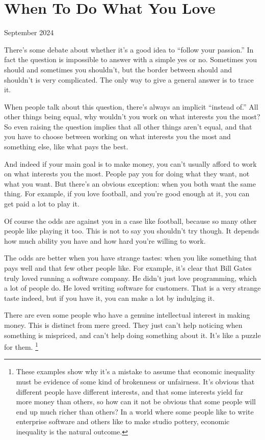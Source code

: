 \chapter{When To Do What You Love}

September 2024

There's some debate about whether it's a good idea to ``follow your
passion.'' In fact the question is impossible to answer with a simple
yes or no. Sometimes you should and sometimes you shouldn't, but the
border between should and shouldn't is very complicated. The only way to
give a general answer is to trace it.

When people talk about this question, there's always an implicit
``instead of.'' All other things being equal, why wouldn't you work on
what interests you the most? So even raising the question implies that
all other things aren't equal, and that you have to choose between
working on what interests you the most and something else, like what
pays the best.

And indeed if your main goal is to make money, you can't usually afford
to work on what interests you the most. People pay you for doing what
they want, not what you want. But there's an obvious exception: when you
both want the same thing. For example, if you love football, and you're
good enough at it, you can get paid a lot to play it.

Of course the odds are against you in a case like football, because so
many other people like playing it too. This is not to say you shouldn't
try though. It depends how much ability you have and how hard you're
willing to work.

The odds are better when you have strange tastes: when you like
something that pays well and that few other people like. For example,
it's clear that Bill Gates truly loved running a software company. He
didn't just love programming, which a lot of people do. He loved writing
software for customers. That is a very strange taste indeed, but if you
have it, you can make a lot by indulging it.

There are even some people who have a genuine intellectual interest in
making money. This is distinct from mere greed. They just can't help
noticing when something is mispriced, and can't help doing something
about it. It's like a puzzle for them. \footnote{These examples show why it's a mistake to assume that economic
inequality must be evidence of some kind of brokenness or unfairness.
It's obvious that different people have different interests, and that
some interests yield far more money than others, so how can it not be
obvious that some people will end up much richer than others? In a world
where some people like to write enterprise software and others like to
make studio pottery, economic inequality is the natural outcome.}

